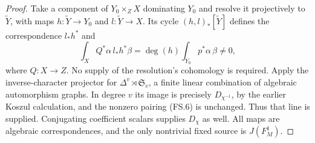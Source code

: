 \begin{proof}
Take a component of $Y_0\times_Z X$ dominating $Y_0$ and resolve
it projectively to $\widetilde Y$, with maps
$h:\widetilde Y\to Y_0$ and $l:\widetilde Y\to X$.
Its cycle $(h,l)_*[\widetilde Y]$ defines the correspondence
$l_*h^*$ and
\[
       \int_X Q^*\alpha\, l_*h^*\beta
           =\deg(h)\int_{Y_0}p^*\alpha\,\beta\ne0,
\tag{FS.6}
\]
where $Q:X\to Z$.  No supply of the resolution's cohomology is
required.  Apply the inverse-character projector for
$\Delta^v\rtimes\mathfrak S_v$, a finite linear combination of
algebraic automorphism graphs.  In degree $v$ its image is precisely
$D_{\chi^{-1}}$, by the earlier Koszul calculation, and the
nonzero pairing (FS.6) is unchanged.  Thus that line is supplied.
Conjugating coefficient scalars supplies $D_\chi$ as well.
All maps are algebraic correspondences, and the only nontrivial
fixed source is $J(F_M^1)$.
\end{proof}

